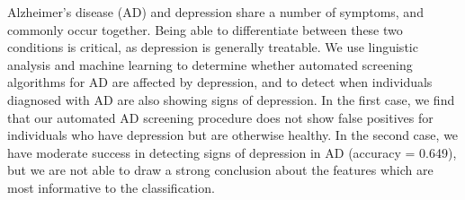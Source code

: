 Alzheimer's disease (AD) and depression share a number of symptoms, and commonly occur together. Being able to differentiate between these two conditions is critical, as depression is generally treatable. We use linguistic analysis and machine learning to determine whether automated screening algorithms for AD are affected by depression, and to detect when individuals diagnosed with AD are also showing signs of depression. In the first case, we find that our automated AD screening procedure does not show false positives for individuals who have depression but are otherwise healthy. In the second case, we have moderate success in detecting signs of depression in AD (accuracy = 0.649), but we are not able to draw a strong conclusion about the features which are most informative to the classification.
